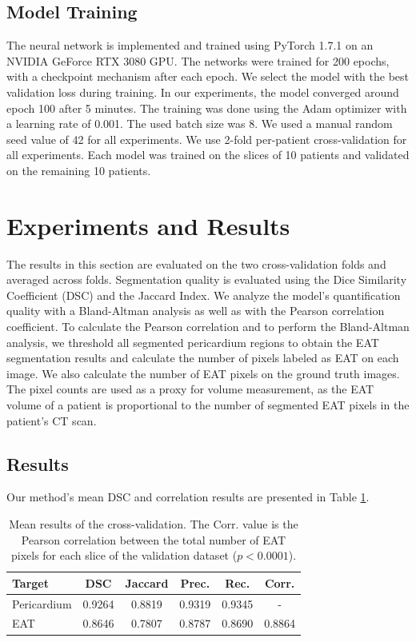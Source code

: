 \subsection{Model Training}

The neural network is implemented and trained using PyTorch 1.7.1 on an NVIDIA GeForce RTX 3080 GPU. The networks were trained for 200 epochs, with a checkpoint mechanism after each epoch. We select the model with the best validation loss during training. In our experiments, the model converged around epoch 100 after 5 minutes. The training was done using the Adam optimizer with a learning rate of 0.001. The used batch size was 8. We used a manual random seed value of 42 for all experiments. We use 2-fold per-patient cross-validation for all experiments. Each model was trained on the slices of 10 patients and validated on the remaining 10 patients.

\section{Experiments and Results}\label{experiment}

The results in this section are evaluated on the two cross-validation folds and averaged across folds. Segmentation quality is evaluated using the Dice Similarity Coefficient (DSC) and the Jaccard Index. We analyze the model's quantification quality with a Bland-Altman analysis \cite{MARTINBLAND1986307} as well as with the Pearson correlation coefficient. To calculate the Pearson correlation and to perform the Bland-Altman analysis, we threshold all segmented pericardium regions to obtain the EAT segmentation results and calculate the number of pixels labeled as EAT on each image. We also calculate the number of EAT pixels on the ground truth images. The pixel counts are used as a proxy for volume measurement, as the EAT volume of a patient is proportional to the number of segmented EAT pixels in the patient's CT scan.

\subsection{Results}

Our method's mean DSC and correlation results are presented in Table \ref{tab:results}. 

\begin{table}[h]
\renewcommand{\arraystretch}{1.4}
\caption{Mean results of the cross-validation. The Corr. value is the Pearson correlation between the total number of EAT pixels for each slice of the validation dataset ($p<0.0001$).}
\centering
\begin{tabularx}{\textwidth}{Xccccc} 
 Target & DSC & Jaccard & Prec. & Rec. & Corr. \\
 \hline
 Pericardium & 0.9264 & 0.8819 & 0.9319 & 0.9345 & - \\ 
 EAT & 0.8646 & 0.7807 & 0.8787 & 0.8690 & 0.8864 \\
\end{tabularx}
\label{tab:results}
\end{table}

